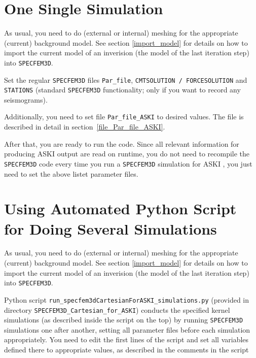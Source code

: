 \documentclass[12pt,a4paper]{article}
\newcommand{\lcode}[1]{\nolinkurl{#1}}
\newcommand{\ASKI}{ {\ttfamily ASKI} }
\begin{document}
%
\section{One Single Simulation} \label{no_script}
%
As usual, you need to do (external or internal) meshing for the appropriate (current) background model. 
See section \ref{import_model} for details on how to import the current model of an inverision (the model of the last
iteration step) into \lcode{SPECFEM3D}.

Set the regular \lcode{SPECFEM3D} files \lcode{Par_file}, \lcode{CMTSOLUTION / FORCESOLUTION} 
and \lcode{STATIONS} (standard \lcode{SPECFEM3D} functionality; only if you want to record any seismograms).

Additionally, you need to set file \lcode{Par_file_ASKI} to desired values. The file is described 
in detail in section~\ref{file_Par_file_ASKI}. 

After that, you are ready to run the code. Since all relevant information for producing \ASKI output 
are read on runtime, you do not need to recompile the \lcode{SPECFEM3D} code every time you
run a \lcode{SPECFEM3D} simulation for \ASKI, you just need to set the above listet parameter files.
%
\section{Using Automated Python Script for Doing Several Simulations} \label{use_script}
%
As usual, you need to do (external or internal) meshing for the appropriate (current) background model. 
See section \ref{import_model} for details on how to import the current model of an inverision (the model of the last
iteration step) into \lcode{SPECFEM3D}.

Python script \lcode{run_specfem3dCartesianForASKI_simulations.py} (provided in directory 
\lcode{SPECFEM3D_Cartesian_for_ASKI}) conducts the specified 
kernel simulations (as described inside the script on the top) by running 
\lcode{SPECFEM3D} simulations one after another, setting all parameter files before each simulation appropriately.
You need to edit the first lines of the script 
and set all variables defined there to appropriate values, as described in the comments in the script 
\end{document}
